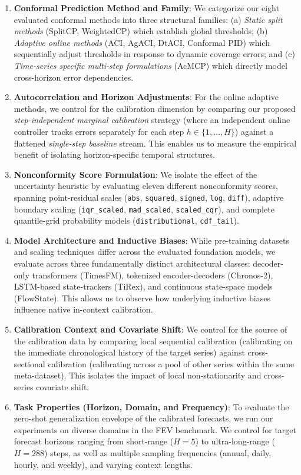 \documentclass[12pt, a4paper]{article}
\begin{document}
\begin{enumerate}
	\item \textbf{Conformal Prediction Method and Family}: We categorize our eight evaluated conformal methods into three structural families: (a) \textit{Static split methods} (SplitCP, WeightedCP) which establish global thresholds; (b) \textit{Adaptive online methods} (ACI, AgACI, DtACI, Conformal PID) which sequentially adjust thresholds in response to dynamic coverage errors; and (c) \textit{Time-series specific multi-step formulations} (AcMCP) which directly model cross-horizon error dependencies.

	\item \textbf{Autocorrelation and Horizon Adjustments}: For the online adaptive methods, we control for the calibration dimension by comparing our proposed \textit{step-independent marginal calibration} strategy (where an independent online controller tracks errors separately for each step \(h \in \{1, \dots, H\}\)) against a flattened \textit{single-step baseline} stream. This enables us to measure the empirical benefit of isolating horizon-specific temporal structures.

	\item \textbf{Nonconformity Score Formulation}: We isolate the effect of the uncertainty heuristic by evaluating eleven different nonconformity scores, spanning point-residual scales (\texttt{abs}, \texttt{squared}, \texttt{signed}, \texttt{log}, \texttt{diff}), adaptive boundary scaling (\texttt{iqr\_scaled}, \texttt{mad\_scaled}, \texttt{scaled\_cqr}), and complete quantile-grid probability models (\texttt{distributional}, \texttt{cdf\_tail}).

	\item \textbf{Model Architecture and Inductive Biases}: While pre-training datasets and scaling techniques differ across the evaluated foundation models, we evaluate across three fundamentally distinct architectural classes: decoder-only transformers (TimesFM), tokenized encoder-decoders (Chronos-2), LSTM-based state-trackers (TiRex), and continuous state-space models (FlowState). This allows us to observe how underlying inductive biases influence native in-context calibration.

	\item \textbf{Calibration Context and Covariate Shift}: We control for the source of the calibration data by comparing local sequential calibration (calibrating on the immediate chronological history of the target series) against cross-sectional calibration (calibrating across a pool of other series within the same meta-dataset). This isolates the impact of local non-stationarity and cross-series covariate shift.

	\item \textbf{Task Properties (Horizon, Domain, and Frequency)}: To evaluate the zero-shot generalization envelope of the calibrated forecasts, we run our experiments on diverse domains in the FEV benchmark. We control for target forecast horizons ranging from short-range (\(H=5\)) to ultra-long-range (\(H=288\)) steps, as well as multiple sampling frequencies (annual, daily, hourly, and weekly), and varying context lengths.
\end{enumerate}
\end{document}
